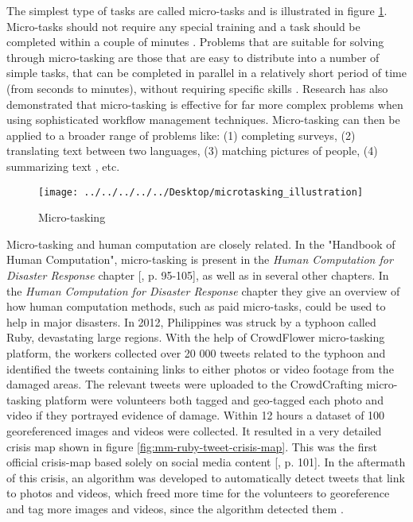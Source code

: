 The simplest type of tasks are called micro-tasks and is illustrated in figure \ref{fig:microtaskingillustration}. Micro-tasks should not require any special training and a task should be completed within a couple of minutes \citep{Ipeirotis2010}. Problems that are suitable for solving through micro-tasking are those that are easy to distribute into a number of simple tasks, that can be completed in parallel in a relatively short period of time (from seconds to minutes), without requiring specific skills \citep{Sarasua2012}. Research has also demonstrated that micro-tasking is effective for far more complex problems when using sophisticated workflow management techniques. Micro-tasking can then be applied to a broader range of problems like: (1) completing surveys, (2) translating text between two languages, (3) matching pictures of people, (4) summarizing text \citep{Bernstein2015a}, etc. 

\begin{figure}[H]
	\centering
	\texttt{[image: ../../../../../Desktop/microtasking\_illustration]}
	\caption{Micro-tasking \citep{Michelucci2015}}
	\label{fig:microtaskingillustration}
\end{figure}

Micro-tasking and human computation are closely related. In the "Handbook of Human Computation", micro-tasking is present in the \textit{Human Computation for Disaster Response} chapter [\citep{Meier2013}, p. 95-105], as well as in several other chapters. In the \textit{Human Computation for Disaster Response} chapter they give an overview of how human computation methods, such as paid micro-tasks, could be used to help in major disasters. In 2012, Philippines was struck by a typhoon called Ruby, devastating large regions. With the help of CrowdFlower micro-tasking platform, the workers collected over 20 000 tweets related to the typhoon and identified the tweets containing links to either photos or video footage from the damaged areas. The relevant tweets were uploaded to the CrowdCrafting micro-tasking platform were volunteers both tagged and geo-tagged each photo and video if they portrayed evidence of damage. Within 12 hours a dataset of 100 georeferenced images and videos were collected. It resulted in a very detailed crisis map shown in figure \ref{fig:mm-ruby-tweet-crisis-map}. This was the first official crisis-map based solely on social media content [\citep{Meier2013}, p. 101]. In the aftermath of this crisis, an algorithm was developed to automatically detect tweets that link to photos and videos, which freed more time for the volunteers to georeference and tag more images and videos, since the algorithm detected them \citep{Meier2014}.

